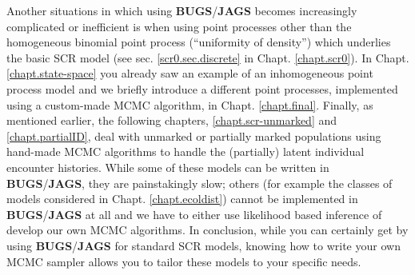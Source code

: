 Another situations in which using {\bf BUGS}/{\bf JAGS} becomes
increasingly
complicated or inefficient is when using point processes other
than the homogeneous binomial point process (``uniformity of density'') which underlies the basic
 SCR model (see sec. \ref{scr0.sec.discrete} in Chapt. \ref {chapt.scr0}). In Chapt.
 \ref {chapt.state-space} you already saw an example of an inhomogeneous point process model  and we briefly introduce a different point processes,
  implemented using a custom-made MCMC algorithm, in Chapt. \ref{chapt.final}. 
Finally, as mentioned earlier, the following chapters, \ref {chapt.scr-unmarked} and \ref {chapt.partialID}, deal with unmarked or
partially marked populations using hand-made MCMC algorithms to
handle the (partially) latent individual encounter histories.
While some of these models can be written in {\bf BUGS}/{\bf JAGS}, they are painstakingly slow; others (for example the classes of models
 considered in Chapt. \ref{chapt.ecoldist}) cannot be implemented in
 {\bf BUGS}/{\bf JAGS} at all and we have to either use likelihood based inference of develop our own MCMC algorithms.
In conclusion, while you can certainly get by using {\bf BUGS}/{\bf JAGS}
for standard SCR models, knowing how to write your own MCMC sampler
allows you to tailor these models to your specific needs.

